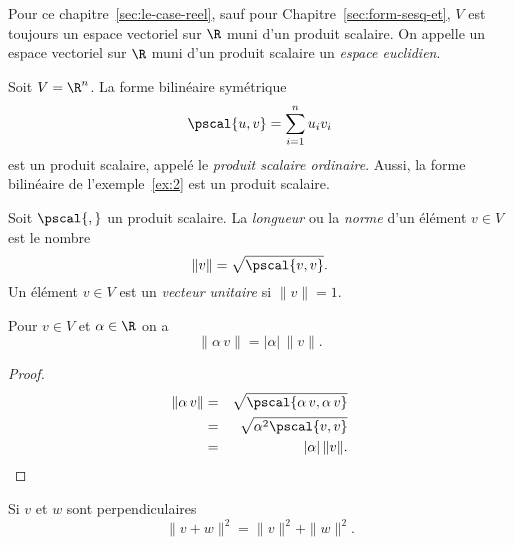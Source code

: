 \begin{framed}\noindent 
  Pour  ce chapitre~\ref{sec:le-case-reel}, sauf pour Chapitre~\ref{sec:form-sesq-et},  $V$
  est toujours un espace vectoriel sur $\R$
  muni d'un produit scalaire. 
On appelle un  espace vectoriel sur $\R$ muni d'un produit scalaire  un \emph{espace euclidien}.  
\end{framed}


\begin{example}
  \label{exe:3}
  Soit $V = \R^n$. La forme bilinéaire symétrique
  \begin{displaymath}
    \pscal{u,v} = \sum_{i=1}^n u_iv_i 
  \end{displaymath}
  est un produit scalaire, appelé le \emph{produit scalaire ordinaire}. 
  Aussi, la forme bilinéaire  de l'exemple~\ref{ex:2} est un produit scalaire. 
\end{example}

\begin{definition}
  \label{def:5}
  Soit $\pscal{,}$ un produit scalaire. La \emph{longueur} ou la \emph{norme} d'un élément $v \in V$ est le nombre 
  \begin{displaymath}
    \| v \| = \sqrt{\pscal{v,v}}.
  \end{displaymath}
  Un élément $v \in V$ est un \emph{vecteur unitaire} si $\|v\| = 1$. 
\end{definition}





\begin{proposition}
  \label{prop:2}
  Pour $v \in V$ et $\alpha \in \R$ on a
  \begin{displaymath}
    \| \alpha \,v \| = |\alpha| \, \|v\|. 
  \end{displaymath}
\end{proposition}



\begin{proof}
  \begin{eqnarray*}    
   \| \alpha \,v \| & = &  \sqrt{\pscal{\alpha \, v, \alpha \, v} } \\
                    & = & \sqrt{\alpha^2 \pscal{v,v}} \\
                    & = & |\alpha | \, \|v\|. 
  \end{eqnarray*}
\end{proof}

\begin{proposition}
\label{prop:4}
Si $v$ et $w$ sont perpendiculaires 
\begin{displaymath}
  \|v+w\|^2 = \|v\|^2 + \|w\|^2. 
\end{displaymath}  
\end{proposition}


